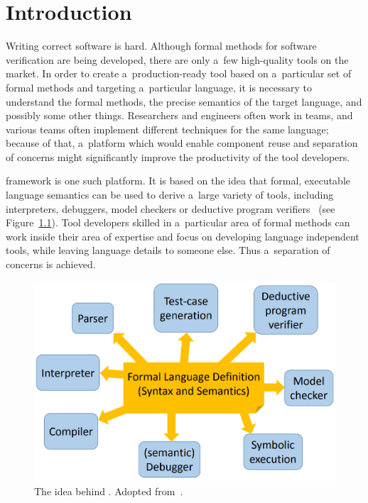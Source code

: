 \documentclass[nolot,nolof,nocover,printed]{fithesis3}
\begin{document}

\chapter{Introduction}

Writing correct software is hard.
Although formal methods for software verification are being developed, there are only a~few high-quality tools on the market. In order to create a~production-ready tool based on a~particular set of formal methods and targeting a~particular language, it is necessary to understand the formal methods, the precise semantics of the target language, and possibly some other things. Researchers and engineers often work in teams, and various teams often implement different techniques for the same language; because of that, a~platform which would enable component reuse and separation of concerns might significantly improve the productivity of the tool developers.

\K framework is one such platform. It is based on the idea that formal, executable language semantics can be used to derive a~large variety of tools, including interpreters, debuggers, model checkers or deductive program verifiers~\cite{rosu-2017-marktoberdorf} (see Figure~\ref{kidea}). Tool developers skilled in a~particular area of formal methods can work inside their area of expertise and focus on developing language independent tools, while leaving language details to someone else. Thus a~separation of concerns is achieved.

\begin{figure}[ht]
\centering
\includegraphics[width=0.7\linewidth]{img/kidea.png}
\caption[The \K idea]{The idea behind \K. Adopted from~\cite{rosu-2015-meseguer}.}
\label{kidea}
\end{figure}
\end{document}
